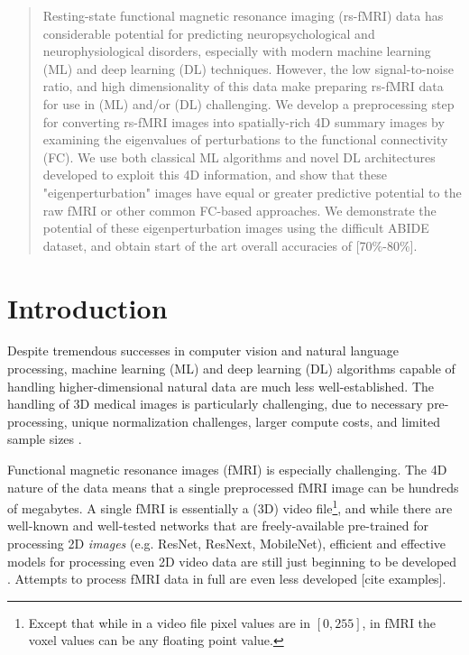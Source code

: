 \documentclass[10pt]{article}
\begin{document}
\maketitle

\begin{abstract}
  Resting-state functional magnetic resonance imaging (rs-fMRI) data has considerable potential for
  predicting neuropsychological and neurophysiological disorders, especially with modern machine
  learning (ML) and deep learning (DL) techniques. However, the low signal-to-noise ratio, and high
  dimensionality of this data make preparing rs-fMRI data for use in (ML) and/or (DL) challenging.
  We develop a preprocessing step for converting rs-fMRI images into spatially-rich 4D summary
  images by examining the eigenvalues of perturbations to the functional connectivity (FC). We use
  both classical ML algorithms and novel DL architectures developed to exploit this 4D information,
  and show that these "eigenperturbation" images have equal or greater predictive potential to the
  raw fMRI or other common FC-based approaches. We demonstrate the potential of these
  eigenperturbation images using the difficult ABIDE dataset, and obtain start of the art overall
  accuracies of [70\%-80\%].
\end{abstract}

\section{Introduction}

Despite tremendous successes in computer vision and natural language processing, machine learning
(ML) and deep learning (DL) algorithms capable of handling higher-dimensional natural data are much
less well-established. The handling of 3D medical images is particularly challenging, due to
necessary pre-processing, unique normalization challenges, larger compute costs, and limited
sample sizes \citep[see][for a general review]{singh3DDeepLearning2020}.

Functional magnetic resonance images (fMRI) is especially challenging. The 4D nature of the data
means that a single preprocessed fMRI image can be hundreds of megabytes. A single fMRI is
essentially a (3D) video file\footnote{Except that while in a video file pixel values are in \([0,
255]\), in fMRI the voxel values can be any floating point value.}, and while there are well-known
and well-tested networks that are freely-available pre-trained for processing 2D \emph{images} (e.g.
ResNet, ResNext, MobileNet), efficient and effective models for processing even 2D video data are
still just beginning to be developed
\citep{xieRethinkingSpatiotemporalFeature2018,tranCloserLookSpatiotemporal2018,wangVideoModelingCorrelation2020}.
Attempts to process fMRI data in full are even less developed [cite examples].
\end{document}
